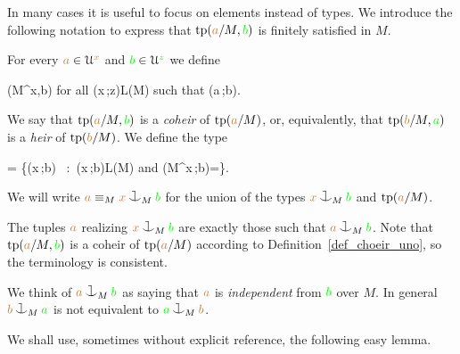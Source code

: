 In many cases it is useful to focus on elements instead of types.
We introduce the following notation to express that ${\rm tp}({\color{brown} a}/M,{\color{green} b})$ is finitely satisfied in $M$.

\begin{definition}\label{def_coheir_idepencence} 
  For every ${\color{brown} a}\in\EuScript U^{\color{brown} x}$ and ${\color{green} b}\in\EuScript U^{\color{green} z}$ we define

  \noindent\llap{\textcolor{red}{\Large\warning}\kern1.5ex}
  {\IFF}
  {\phi(M^{\mr x},{\gr b})\neq\0
  \textrm{ for all }\phi({\mr x}\,;{\gr z})\in L(M) 
  \textrm{ such that }\phi({\mr a}\,;{\gr b})}.

  We say that ${\rm tp}({\color{brown} a}/M,{\color{green} b})$ is a \emph{coheir} of ${\rm tp}({\color{brown} a}/M)$, or, equivalently, that ${\rm tp}({\color{brown} b}/M,{\color{green} a})$ is a \emph{heir} of ${\rm tp}({\color{brown} b}/M)$.
  We define the type

  {=}
  {\Big\{\neg\phi({\mr x}\,;{\gr b})
  \ :\ 
  \phi({\mr x}\,;{\gr b})\in L(M)
  \textrm{ and } \phi(M^{\mr x}\,;{\gr b})=\0\Big\}.}

  We will write \emph{${\mr a}\equiv_M{\mr x}\cnonfork_M{\gr b}$} 
  for the union of the types ${\mr x}\cnonfork_M{\gr b}$ and 
  ${\rm tp}({\color{brown} a}/M)$.
\end{definition}
 The tuples ${\color{brown} a}$ realizing ${\mr x}\cnonfork_M{\gr b}$ are exactly those such that ${\mr a}\cnonfork_M{\gr b}$.
 Note that ${\rm tp}({\color{brown} a}/M,{\color{green} b})$ is a coheir of ${\rm tp}({\color{brown} a}/M)$ according to Definition~\ref{def_choeir_uno}, so the terminology is consistent.

We think of  ${\mr a}\cnonfork_M{\gr b}$ as saying that 
${\color{brown} a}$ is \emph{independent\/} from ${\color{green} b}$ over $M$.
%
%
In general %
${\mr b}\cnonfork_M{\gr a}$ is not 
equivalent to ${\gr a}\cnonfork_M{\mr b}$.

We shall use, sometimes without explicit reference, the following easy lemma.

